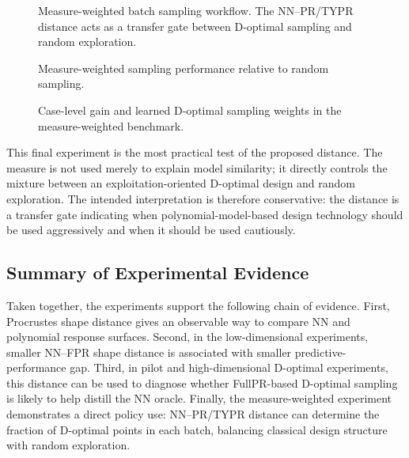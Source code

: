 \documentclass[]{interact}
\theoremstyle{plain}
\theoremstyle{definition}
\theoremstyle{remark}
\begin{document}
\begin{figure}[htbp]
\centering
{}
\caption{Measure-weighted batch sampling workflow. The NN--PR/TYPR distance
acts as a transfer gate between D-optimal sampling and random exploration.}
\label{fig:measure-weighted-flowchart}
\end{figure}

\begin{figure}[htbp]
\centering
{}
\hfill
{}
\caption{Measure-weighted sampling performance relative to random sampling.}
\label{fig:measure-weighted-gain}
\end{figure}

\begin{figure}[htbp]
\centering
{}
\hfill
{}
\caption{Case-level gain and learned D-optimal sampling weights in the
measure-weighted benchmark.}
\label{fig:measure-weighted-heatmaps}
\end{figure}

\FloatBarrier

This final experiment is the most practical test of the proposed distance. The
measure is not used merely to explain model similarity; it directly controls
the mixture between an exploitation-oriented D-optimal design and random
exploration. The intended interpretation is therefore conservative: the
distance is a transfer gate indicating when polynomial-model-based design
technology should be used aggressively and when it should be used cautiously.

\subsection{Summary of Experimental Evidence}

Taken together, the experiments support the following chain of evidence. First,
Procrustes shape distance gives an observable way to compare NN and polynomial
response surfaces. Second, in the low-dimensional experiments, smaller
NN--FPR shape distance is associated with smaller predictive-performance gap.
Third, in pilot and high-dimensional D-optimal experiments, this distance can
be used to diagnose whether FullPR-based D-optimal sampling is likely to help
distill the NN oracle. Finally, the measure-weighted experiment demonstrates a
direct policy use: NN--PR/TYPR distance can determine the fraction of
D-optimal points in each batch, balancing classical design structure with
random exploration.




\end{document}
